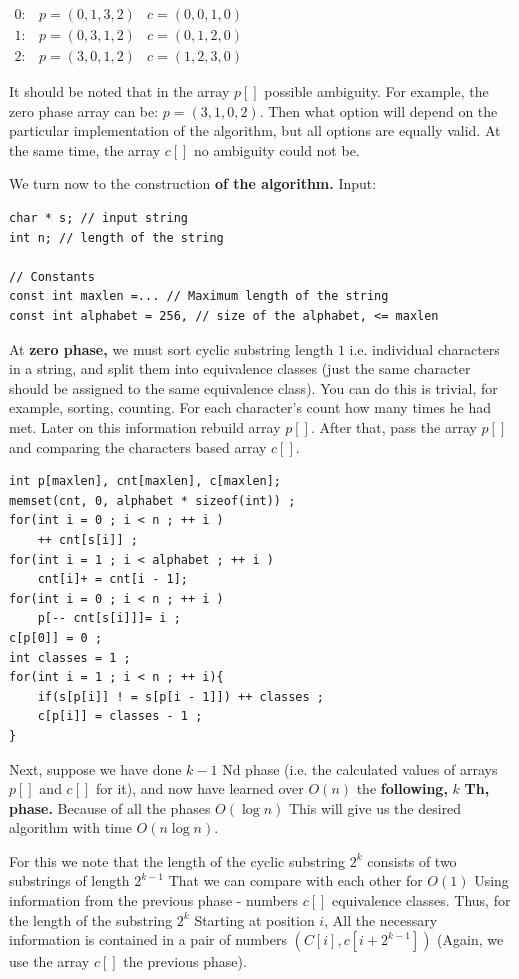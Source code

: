 $\begin{array}{ccc}
0: & p=(0,1,3,2) & c=(0,0,1,0)\\
1: & p=(0,3,1,2) & c=(0,1,2,0)\\
2: & p=(3,0,1,2) & c=(1,2,3,0)
\end{array}$

It should be noted that in the array $p []$ possible ambiguity. For example, the zero phase array can be: $p = (3,1,0,2)$. Then what option will depend on the particular implementation of the algorithm, but all options are equally valid. At the same time, the array $c []$ no ambiguity could not be.

We turn now to the construction \textbf{of the algorithm.} Input:

\begin{verbatim}
char * s; // input string
int n; // length of the string
 
// Constants
const int maxlen =... // Maximum length of the string
const int alphabet = 256, // size of the alphabet, <= maxlen
\end{verbatim}
At \textbf{zero phase,} we must sort cyclic substring length $1$ i.e. individual characters in a string, and split them into equivalence classes (just the same character should be assigned to the same equivalence class). You can do this is trivial, for example, sorting, counting. For each character's count how many times he had met. Later on this information rebuild array $p []$. After that, pass the array $p []$ and comparing the characters based array $c []$.

\begin{verbatim}
int p[maxlen], cnt[maxlen], c[maxlen];
memset(cnt, 0, alphabet * sizeof(int)) ;
for(int i = 0 ; i < n ; ++ i )
    ++ cnt[s[i]] ;
for(int i = 1 ; i < alphabet ; ++ i )
    cnt[i]+ = cnt[i - 1];
for(int i = 0 ; i < n ; ++ i )
    p[-- cnt[s[i]]]= i ;
c[p[0]] = 0 ;
int classes = 1 ;
for(int i = 1 ; i < n ; ++ i){
    if(s[p[i]] ! = s[p[i - 1]]) ++ classes ;
    c[p[i]] = classes - 1 ;
} 
\end{verbatim}
Next, suppose we have done $k-1$ Nd phase (i.e. the calculated values ​​of arrays $p []$ and $c []$ for it), and now have learned over $O (n)$ the \textbf{following,} \textbf{$k$} \textbf{Th, phase.} Because of all the phases $O (\log n)$ This will give us the desired algorithm with time $O (n \log n)$.

For this we note that the length of the cyclic substring $2 ^ k$ consists of two substrings of length $2 ^ {k-1}$ That we can compare with each other for $O (1)$ Using information from the previous phase - numbers $c []$ equivalence classes. Thus, for the length of the substring $2 ^ k$ Starting at position $i$, All the necessary information is contained in a pair of numbers $(C [i], c [i +2 ^ {k-1}])$ (Again, we use the array $c []$ the previous phase).

